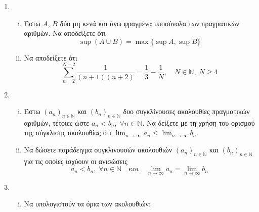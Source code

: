 


\thispagestyle{empty}



\begin{center}
\end{center}


\begin{enumerate}
    \item 
        \begin{enumerate}[i)]
            \item Έστω $A$, $B$ δύο μη κενά και άνω φραγμένα υποσύνολα των 
                πραγματικών αριθμών.  Να αποδείξετε ότι 
                \[
                    \sup (A \cup B) = \max \{ \sup A, \sup B \} 
                \] 
            \item Να αποδείξετε ότι 
                \[
                    \sum_{n=2}^{N-2} \frac{1}{(n+1)(n+2)} = \frac{1}{3} - \frac{1}{N}, 
                    \quad N \in \mathbb{N}, \; N \geq 4
                \] 
        \end{enumerate}

    \item 
        \begin{enumerate}[i)]
            \item Έστω $ {(a_{n})}_{n \in \mathbb{N}} $ και 
                $ {(b_{n})}_{n \in \mathbb{N}} $ δυο συγκλίνουσες ακολουθίες 
                πραγματικών αριθμών, τέτοιες ώστε $ a_{n} < b_{n}, \; \forall n 
                \in \mathbb{N} $. Να δείξετε με τη χρήση του 
                ορισμού της σύγκλισης ακολουθίας ότι $ \lim_{n \to \infty} a_{n} 
                \leq \lim_{n \to \infty} b_{n}$.

            \item Να δώσετε παράδειγμα συγκλινουσών ακολουθιών 
                $ {(a_{n})}_{n \in \mathbb{N}} $ και
                $ {(b_{n})}_{n \in \mathbb{N}} $ για τις οποίες ισχύουν οι 
                ανισώσεις 
                \[
                    a_{n} < b_{n}, \; \forall n \in \mathbb{N} \quad \text{και} \quad 
                    \lim_{n \to \infty} a_{n} = \lim_{n \to \infty} b_{n}
                \] 
        \end{enumerate}

    \item 
        \begin{enumerate}[i)]
            \item Να υπολογιστούν τα όρια των ακολουθιών:


\end{enumerate}
\end{enumerate}
